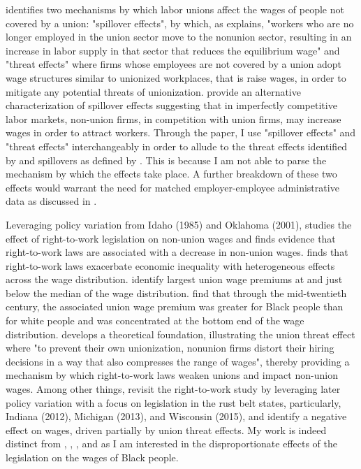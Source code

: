 \documentclass[11pt]{article}
\begin{document}
\citet{lewis1963} identifies two mechanisms by which labor unions affect the wages of people not covered by a union: "spillover effects", by which, as \citet{farber2005} explains, "workers who are no longer employed in the union sector move to the nonunion sector, resulting in an increase in labor supply in that sector that reduces the equilibrium wage" and "threat effects" where firms whose employees are not covered by a union adopt wage structures similar to unionized workplaces, that is raise wages, in order to mitigate any potential threats of unionization. \citet{fll2021} provide an alternative characterization of spillover effects suggesting that in imperfectly competitive labor markets, non-union firms, in competition with union firms, may increase wages in order to attract workers. Through the paper, I use "spillover effects" and "threat effects" interchangeably in order to allude to the threat effects identified by \citet{lewis1963} and spillovers as defined by \citet{fll2021}. This is because I am not able to parse the mechanism by which the effects take place. A further breakdown of these two effects would warrant the need for matched employer-employee administrative data as discussed in \citet{fll2021}.

Leveraging policy variation from Idaho (1985) and Oklahoma (2001), \citet{farber2005} studies the effect of right-to-work legislation on non-union wages and finds evidence that right-to-work laws are associated with a decrease in non-union wages. \citet{vanheuvelen2020} finds that right-to-work laws exacerbate economic inequality with heterogeneous effects across the wage distribution. \citet{ffl2009} identify largest union wage premiums at and just below the median of the wage distribution. \citet{callawaycollins2018} find that through the mid-twentieth century, the associated union wage premium was greater for Black people than for white people and was concentrated at the bottom end of the wage distribution. \citet{taschereau-dumouchel2020} develops a theoretical foundation, illustrating the union threat effect where "to prevent their own unionization, nonunion firms distort their hiring decisions in a way that also compresses the range of wages", thereby providing a mechanism by which right-to-work laws weaken unions and impact non-union wages. Among other things, \citet{fll2018} revisit the right-to-work study by \citet{farber2005} leveraging later policy variation with a focus on legislation in the rust belt states, particularly, Indiana (2012), Michigan (2013), and Wisconsin (2015), and identify a negative effect on wages, driven partially by union threat effects. My work is indeed distinct from \citet{farber2005}, \citet{vanheuvelen2020}, \citet{taschereau-dumouchel2020}, and \citet{fll2018} as I am interested in the disproportionate effects of the legislation on the wages of Black people.
\end{document}
